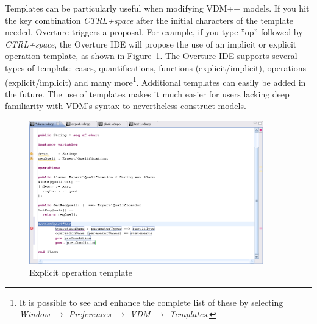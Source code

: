 Templates can be particularly useful when modifying VDM++ models. If you hit the key combination \textit{CTRL+space} after the initial characters of the template needed, Overture triggers a proposal. For example, if you type ''op'' followed by \textit{CTRL+space}, the Overture IDE will propose the use of an implicit or explicit operation template, as shown in Figure~\ref{fig:operationTemplate}. The Overture IDE supports several types of template: cases, quantifications, functions (explicit/implicit), operations (explicit/implicit) and many more\footnote{It is possible to see and enhance the complete list of these by selecting \emph{Window} $\rightarrow$ \emph{Preferences} $\rightarrow$ \emph{VDM}  $\rightarrow$ \emph{Templates}.}.  Additional templates can easily be added in the future. The use of templates makes it much easier for users lacking deep familiarity with VDM's syntax to nevertheless construct models.
%
\begin{figure}
	\begin{center}
	\includegraphics[width=4in]{figures/OperationTemplate}
	\caption{Explicit operation template}
	\label{fig:operationTemplate}
	\end{center}
\end{figure}

